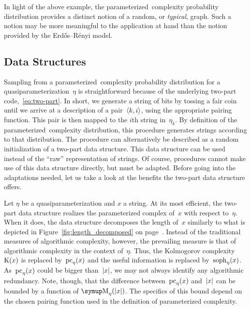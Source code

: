 In light of the above example, the parameterized~complexity probability distribution provides a distinct notion of a random, or \emph{typical}, graph.
Such a notion may be more meaningful to the application at hand than the notion provided by the Erd{\H{o}}s--R{\'e}nyi model.

\subsection{Data Structures}
\label{sec:statistics:data_structures}%
Sampling from a parameterized~complexity probability distribution for a quasiparameterization~$\eta$ is straightforward because of the underlying two-part code,~\eqref{eq:two-part}.
In short, we generate a string of bits by tossing a fair coin until we arrive at a description of a pair~${\langle k, i\rangle}$, using the appropriate pairing function.
This pair is then mapped to the $i$th string in~$\eta_k$.
By definition of the parameterized~complexity distribution, this procedure generates strings according to that distribution.
The procedure can alternatively be described as a random initialization of a two-part data structure.
This data structure can be used instead of the \enquote{raw} representation of strings.
Of course, procedures cannot make use of this data structure directly, but must be adapted.
Before going into the adaptations needed, let us take a look at the benefits the two-part data structure offers.

Let $\eta$ be a quasiparameterization and $x$ a string.
At its most efficient, the two-part data structure realizes the parameterized complex of~$x$ with respect to~$\eta$.
When it does, the data structure decomposes the length of~$x$ similarly to what is depicted in Figure~\ref{fig:length_decomposed} on page~\pageref{fig:length_decomposed}.
Instead of the traditional measures of algorithmic complexity, however, the prevailing measure is that of algorithmic complexity in the context of~$\eta$.
Thus, the Kolmogorov complexity~$\operatorname{K}(x)$ is replaced by~$\operatorname{pc}_\eta(x)$ and the useful information is replaced by~$\operatorname{soph}_\eta(x)$.
As~$\operatorname{pc}_\eta(x)$ could be bigger than~${\lvert x\rvert}$, we may not always identify any algorithmic redundancy.
Note, though, that the difference between~$\operatorname{pc}_\eta(x)$ and~${\lvert x\rvert}$ can be bounded by a function of $\upM_\eta(\length{x})$.
The specifics of this bound depend on the chosen pairing function used in the definition of parameterized complexity.

